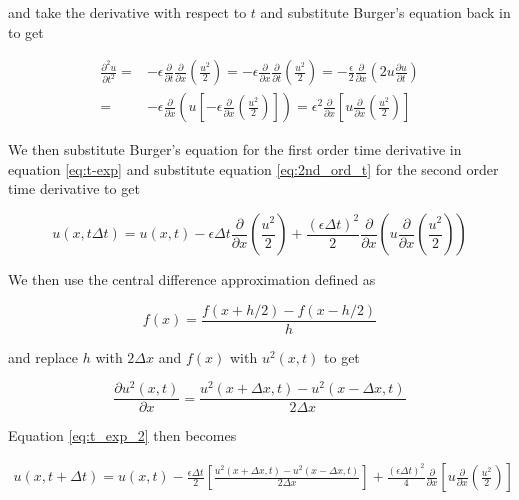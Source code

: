 \documentclass{article}
\begin{document}
and take the derivative with respect to $t$  and substitute Burger's equation back in to get

\begin{equation}
\begin{split}
	\label{eq:2nd_ord_t}
	\frac{\partial^2 u }{\partial t^2} =& - \epsilon \frac{\partial }{\partial t}\frac{\partial }{\partial x} \left(\frac{u^2}{2} \right)
	= - \epsilon \frac{\partial }{\partial x}\frac{\partial }{\partial t} \left(\frac{u^2}{2} \right)
	= - \frac{\epsilon}{2} \frac{\partial }{\partial x}\left( 2u\frac{\partial u}{\partial t} \right)
	\\ =& - \epsilon \frac{\partial }{\partial x} \left( u \left[ -\epsilon \frac{\partial }{\partial x} \left(\frac{u^2}{2} \right) \right] \right)
	= \epsilon^2 \frac{\partial}{\partial x} \left[u \frac{\partial}{\partial x}\left( \frac{u^2}{2}\right) \right]
\end{split}
\end{equation}

We then substitute Burger's equation for the first order time derivative in equation \ref{eq:t-exp} and substitute equation \ref{eq:2nd_ord_t} for the second order time derivative to get

\begin{equation}
	\label{eq:t_exp_2}
	u(x,t\Delta t) = u(x,t) - \epsilon \Delta t \frac{\partial }{\partial x} \left(\frac{u^2}{2}\right) + \frac{(\epsilon\Delta t)^2}{2}\frac{\partial}{\partial x }\left(u\frac{\partial}{\partial x}\left(\frac{u^2}{2}\right) \right)
\end{equation}

We then use the central difference approximation defined as 

\begin{equation}
	f(x) = \frac{f(x+h/2) - f(x-h/2)}{h}
\end{equation}

and replace $h$ with $2\Delta x$ and $f(x)$ with $u^2(x,t)$ to get 

\begin{equation}
	\frac{\partial u^2(x,t)}{\partial x} = \frac{u^2(x+\Delta x, t) - u^2(x-\Delta x, t)}{2\Delta x}
\end{equation}

Equation \ref{eq:t_exp_2} then becomes

\begin{equation}
\begin{split}
	\label{eq:t_exp_3}
	u(x,t+\Delta t) = u(x,t) - \frac{\epsilon \Delta t}{2} \left[ \frac{u^2(x+\Delta x, t) - u^2(x-\Delta x, t)}{2\Delta x} \right] + \frac{(\epsilon\Delta t)^2}{4}\frac{\partial}{\partial x }\left[u\frac{\partial}{\partial x}\left(\frac{u^2}{2}\right) \right]
\end{split}
\end{equation}
\end{document}
